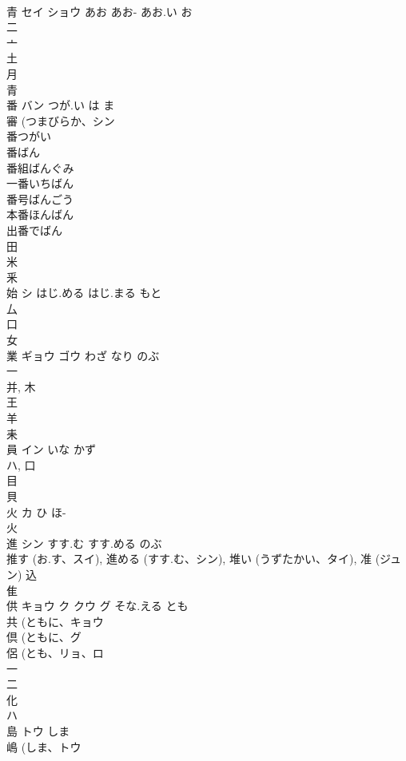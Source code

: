 \documentclass[8pt]{extreport}
\begin{document}
\begin{CJK}{UTF8}{min}
\\	青	セイ ショウ	あお あお- あお.い お	
\\	二 
\\	亠 
\\	土 
\\	月 
\\	青 
\\	番	バン	つが.い は ま	
\\	審 (つまびらか、シン 
\\	番つがい
\\	番ばん
\\	番組ばんぐみ
\\	一番いちばん
\\	番号ばんごう
\\	本番ほんばん
\\	出番でばん
\\	田 
\\	米 
\\	釆 
\\	始	シ	はじ.める はじ.まる もと	
\\	厶 
\\	口 
\\	女 
\\	業	ギョウ ゴウ	わざ なり のぶ	
\\	一 
\\	并, 木 
\\	王 
\\	羊 
\\	耒 
\\	員	イン	いな かず	
\\	ハ, 口 
\\	目 
\\	貝 
\\	火	カ	ひ ほ-	
\\	火 
\\	進	シン	すす.む すす.める のぶ	
\\	推す (お.す、スイ), 進める (すす.む、シン), 堆い (うずたかい、タイ), 准 (ジュン)			込 
\\	隹 
\\	供	キョウ ク クウ グ	そな.える とも	
\\	共 (ともに、キョウ 
\\	倶 (ともに、グ 
\\	侶 (とも、リョ、ロ 
\\	一 
\\	二 
\\	化 
\\	ハ	
\\	島	トウ	しま	
\\	嶋 (しま、トウ 

\end{CJK}
\end{document}
